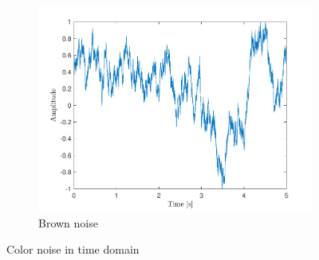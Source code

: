 \documentclass[10pt]{article}
\begin{document}
\begin{figure}[ht]
\begin{subfigure}[b]{0.31\textwidth}
        \includegraphics[width=\textwidth]{problem11_brown_noise_time.pdf}
        \caption{Brown noise}
    \end{subfigure}
    \caption{Color noise in time domain\vspace{-0.5cm}}
    \label{color_noise_time_domain}
\end{figure}
\end{document}

